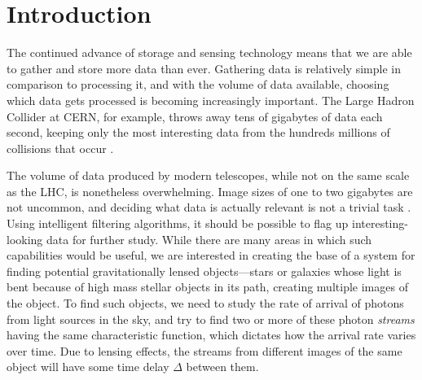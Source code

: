 \documentclass[a4paper,11pt,twoside]{article}
\begin{document}
\section{Introduction}
\label{sec-1}

  The continued advance of storage and sensing technology means that we are able
  to gather and store more data than ever. Gathering data is relatively simple
  in comparison to processing it, and with the volume of data available,
  choosing which data gets processed is becoming increasingly important. The
  Large Hadron Collider at CERN, for example, throws away tens of gigabytes of
  data each second, keeping only the most interesting data from the hundreds
  millions of collisions that occur \cite{WLCGproc}.

  The volume of data produced by modern telescopes, while not on the same scale
  as the LHC, is nonetheless overwhelming. Image sizes of one to two gigabytes
  are not uncommon, and deciding what data is actually relevant is not a trivial
  task \cite{starck2002handbook}. Using intelligent filtering algorithms, it
  should be possible to flag up interesting-looking data for further
  study. While there are many areas in which such capabilities would be useful,
  we are interested in creating the base of a system for finding potential
  gravitationally lensed objects---stars or galaxies whose light is bent because
  of high mass stellar objects in its path, creating multiple images of the
  object. To find such objects, we need to study the rate of arrival of photons
  from light sources in the sky, and try to find two or more of these photon
  \emph{streams} having the same characteristic function, which dictates how the
  arrival rate varies over time. Due to lensing effects, the streams from
  different images of the same object will have some time delay $\Delta$ between
  them. 
  
\end{document}
